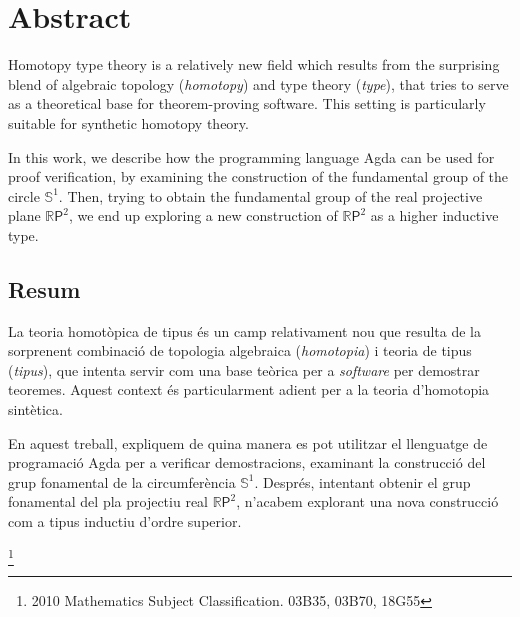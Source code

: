 \section*{Abstract}

Homotopy type theory is a relatively new field which results from the surprising blend of algebraic topology (\textit{homotopy}) and type theory (\textit{type}), that tries to serve as a theoretical base for theorem-proving software.
This setting is particularly suitable for synthetic homotopy theory.

In this work, we describe how the programming language Agda can be used for proof verification, by examining the construction of the fundamental group of the circle $\mathbb{S}^{1}$.
Then, trying to obtain the fundamental group of the real projective plane $\mathbb{R}\mathsf{P}^2$, we end up exploring a new construction of $\mathbb{R}\mathsf{P}^2$ as a higher inductive type.

\begin{otherlanguage}{catalan}
\section*{Resum}

La teoria homotòpica de tipus és un camp relativament nou que resulta de la sorprenent combinació de topologia algebraica (\textit{homotopia}) i teoria de tipus (\textit{tipus}), que intenta servir com una base teòrica per a \textit{software} per demostrar teoremes.
Aquest context és particularment adient per a la teoria d'homotopia sintètica.

En aquest treball, expliquem de quina manera es pot utilitzar el llenguatge de programació Agda per a verificar demostracions, examinant la construcció del grup fonamental de la circumferència $\mathbb{S}^{1}$.
Després, intentant obtenir el grup fonamental del pla projectiu real $\mathbb{R}\mathsf{P}^2$, n'acabem explorant una nova construcció com a tipus inductiu d'ordre superior.
\end{otherlanguage}

{\let\thefootnote\relax\footnote{2010 Mathematics Subject Classification. 03B35, 03B70, 18G55}}
